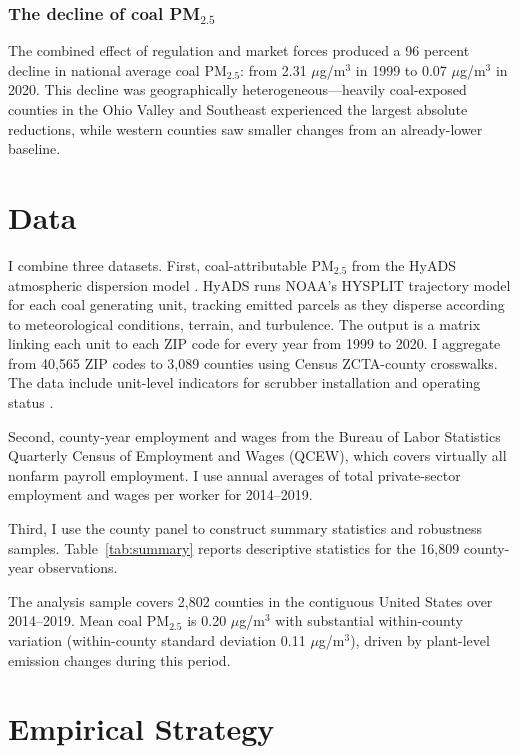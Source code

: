 \documentclass[12pt]{article}
\begin{document}
\subsubsection*{The decline of coal PM$_{2.5}$} The combined effect of regulation and market forces produced a 96 percent decline in national average coal PM$_{2.5}$: from 2.31 $\mu$g/m$^3$ in 1999 to 0.07 $\mu$g/m$^3$ in 2020. This decline was geographically heterogeneous---heavily coal-exposed counties in the Ohio Valley and Southeast experienced the largest absolute reductions, while western counties saw smaller changes from an already-lower baseline.

\section{Data}

I combine three datasets. First, coal-attributable PM$_{2.5}$ from the HyADS atmospheric dispersion model \citep{henneman2019hyads, henneman2023mortality}. HyADS runs NOAA's HYSPLIT trajectory model for each coal generating unit, tracking emitted parcels as they disperse according to meteorological conditions, terrain, and turbulence. The output is a matrix linking each unit to each ZIP code for every year from 1999 to 2020. I aggregate from 40,565 ZIP codes to 3,089 counties using Census ZCTA-county crosswalks. The data include unit-level indicators for scrubber installation and operating status \citep{henneman2023osf}.

Second, county-year employment and wages from the Bureau of Labor Statistics Quarterly Census of Employment and Wages (QCEW), which covers virtually all nonfarm payroll employment. I use annual averages of total private-sector employment and wages per worker for 2014--2019.

Third, I use the county panel to construct summary statistics and robustness samples. Table~\ref{tab:summary} reports descriptive statistics for the 16,809 county-year observations.



The analysis sample covers 2,802 counties in the contiguous United States over 2014--2019. Mean coal PM$_{2.5}$ is 0.20 $\mu$g/m$^3$ with substantial within-county variation (within-county standard deviation 0.11 $\mu$g/m$^3$), driven by plant-level emission changes during this period.

\section{Empirical Strategy}
\end{document}
